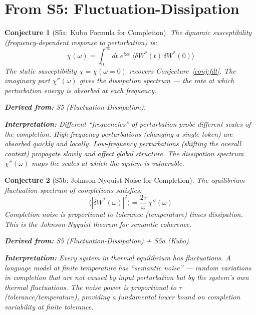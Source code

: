 \documentclass[11pt,letterpaper]{article}
\newtheorem{conjecture}{Conjecture}[section]
\begin{document}
\newpage
\section{From S5: Fluctuation-Dissipation}

\begin{conjecture}[S5a: Kubo Formula for 
Completion]\label{conj:kubo}
The dynamic susceptibility (frequency-dependent response to perturbation) 
is:
\begin{equation}
    \chi(\omega) = \int_0^\infty dt \; e^{i\omega t} \; 
    \langle \delta W^*(t) \, \delta W^*(0) \rangle
\end{equation}
The static susceptibility $\chi = \chi(\omega = 0)$ recovers 
Conjecture~\ref{conj:fdt}. The imaginary part $\chi''(\omega)$ gives the 
dissipation spectrum --- the rate at which perturbation energy is absorbed 
at each frequency.

\textbf{Derived from:} S5 (Fluctuation-Dissipation).

\textbf{Interpretation:} Different ``frequencies'' of perturbation probe 
different scales of the completion. High-frequency perturbations (changing 
a single token) are absorbed quickly and locally. Low-frequency 
perturbations (shifting the overall context) propagate slowly and affect 
global structure. The dissipation spectrum $\chi''(\omega)$ maps the 
scales at which the system is vulnerable.
\end{conjecture}

\begin{conjecture}[S5b: Johnson-Nyquist Noise for 
Completion]\label{conj:johnson}
The equilibrium fluctuation spectrum of completions satisfies:
\begin{equation}
    \langle |\delta W^*(\omega)|^2 \rangle = \frac{2\tau}{\omega} \, 
    \chi''(\omega)
\end{equation}
Completion noise is proportional to tolerance (temperature) times 
dissipation. This is the Johnson-Nyquist theorem for semantic coherence.

\textbf{Derived from:} S5 (Fluctuation-Dissipation) + S5a (Kubo).

\textbf{Interpretation:} Every system in thermal equilibrium has 
fluctuations. A language model at finite temperature has ``semantic noise'' 
--- random variations in completion that are not caused by input 
perturbation but by the system's own thermal fluctuations. The noise 
power is proportional to $\tau$ (tolerance/temperature), providing a 
fundamental lower bound on completion variability at finite tolerance.
\end{conjecture}
\end{document}
